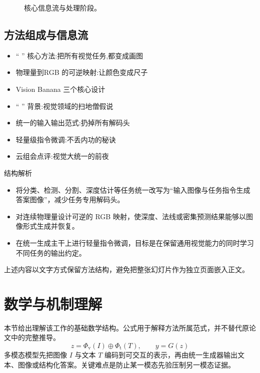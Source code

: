 \documentclass[UTF8,11pt,a4paper]{ctexart}
\begin{document}
\begin{figure}[H]
\centering
{}
\caption{核心信息流与处理阶段。}
\end{figure}

\subsection{方法组成与信息流}
\begin{itemize}
\item “ ” 核心方法:把所有视觉任务,都变成画图
\item 物理量到RGB 的可逆映射:让颜色变成尺子
\item Vision Banana 三个核心设计
\item “ ” 背景:视觉领域的扫地僧假说
\item 统一的输入输出范式:扔掉所有解码头
\item 轻量级指令微调:不丢内功的秘诀
\item 云组会点评:视觉大统一的前夜
\end{itemize}

\begin{keybox}{结构解析}
\begin{itemize}
\item 将分类、检测、分割、深度估计等任务统一改写为“输入图像与任务指令生成答案图像”，减少任务专用解码头。
\item 对连续物理量设计可逆的 RGB 映射，使深度、法线或密集预测结果能够以图像形式生成并恢复。
\item 在统一生成主干上进行轻量指令微调，目标是在保留通用视觉能力的同时学习不同任务的输出约定。
\end{itemize}
\end{keybox}

上述内容以文字方式保留方法结构，避免把整张幻灯片作为独立页面嵌入正文。

\section{数学与机制理解}
本节给出理解该工作的基础数学结构。公式用于解释方法所属范式，并不替代原论文中的完整推导。
\begin{equation}
z=\Phi_{\mathrm v}(I)\oplus\Phi_{\mathrm t}(T),\qquad y=G(z)
\end{equation}
多模态模型先把图像 $I$ 与文本 $T$ 编码到可交互的表示，再由统一生成器输出文本、图像或结构化答案。关键难点是防止某一模态先验压制另一模态证据。
\end{document}
